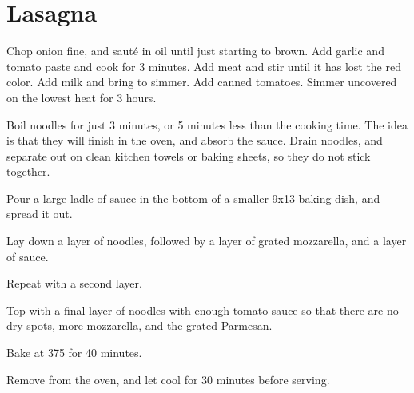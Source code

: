 \section{Lasagna}

\begin{recipe}



Chop onion fine, and sauté in oil until just starting to brown. Add garlic and tomato paste and cook for 3 minutes.
Add meat and stir until it has lost the red color. Add milk and bring to simmer. Add canned tomatoes.
Simmer uncovered on the lowest heat for 3 hours.


Boil noodles for just 3 minutes, or 5 minutes less than the cooking time. The idea is that they will finish in the oven,
and absorb the sauce. Drain noodles, and separate out on clean kitchen towels or baking sheets, so they do not stick together.

Pour a large ladle of sauce in the bottom of a smaller 9x13 baking dish, and spread it out.

Lay down a layer of noodles, followed by a layer of grated mozzarella, and a layer of sauce.

Repeat with a second layer.


Top with a final layer of noodles with enough tomato sauce so that there are no dry spots, more mozzarella, and the grated Parmesan.

Bake at 375\degree{} for 40 minutes.

Remove from the oven, and let cool for 30 minutes before serving.

\end{recipe}
